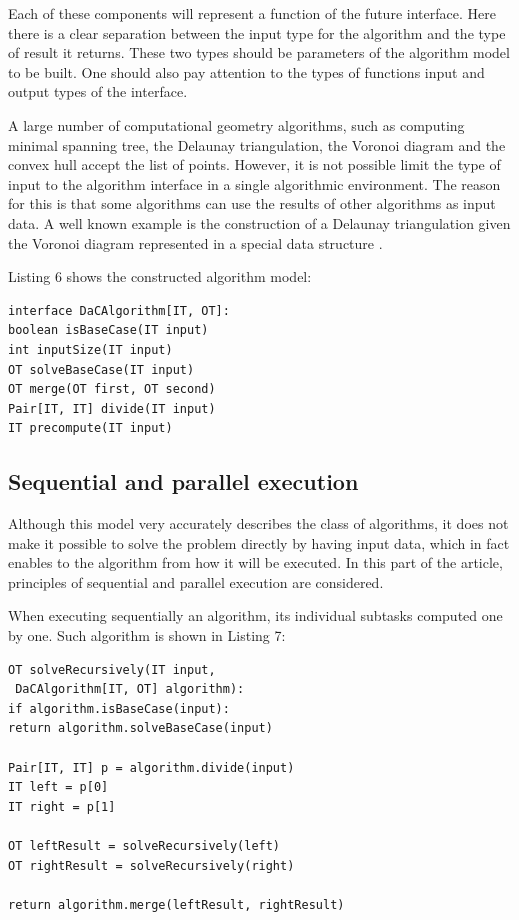 \documentclass[conference]{IEEEtran}
\theoremstyle{plane}
\begin{document}
Each of these components will represent a function of the future interface. Here there is a clear separation between the input type for the algorithm and the type of result it returns. These two types should be parameters of the algorithm model to be built. One should also pay attention to the types of functions input and output types of the interface.

A large number of computational geometry algorithms, such as computing minimal spanning tree, the Delaunay triangulation, the Voronoi diagram and the convex hull accept the list of points. However, it is not possible limit the type of input to the algorithm interface in a single algorithmic environment. The reason for this is that some algorithms can use the results of other algorithms as input data. A well known example is the construction of a Delaunay triangulation given the Voronoi diagram represented in a special data structure \cite[pp.~209]{shamos}.

Listing 6 shows the constructed algorithm model:

\begin{lstlisting}[caption={Algorithm model based on the divide and conquer principle},captionpos=b]
interface DaCAlgorithm[IT, OT]:
boolean isBaseCase(IT input)
int inputSize(IT input)
OT solveBaseCase(IT input)
OT merge(OT first, OT second)
Pair[IT, IT] divide(IT input)
IT precompute(IT input)
\end{lstlisting}

\subsection{Sequential and parallel execution}

Although this model very accurately describes the class of algorithms, it does not make it possible to solve the problem directly by having input data, which in fact enables to the algorithm from how it will be executed. In this part of the article, principles of sequential and parallel execution are considered.

When executing sequentially an algorithm, its individual subtasks computed one by one. Such algorithm is shown in Listing 7:

\begin{lstlisting}[caption={Sequential execution algorithm},captionpos=b]
OT solveRecursively(IT input,
 DaCAlgorithm[IT, OT] algorithm):
if algorithm.isBaseCase(input):
return algorithm.solveBaseCase(input)

Pair[IT, IT] p = algorithm.divide(input)
IT left = p[0]
IT right = p[1]

OT leftResult = solveRecursively(left)
OT rightResult = solveRecursively(right)

return algorithm.merge(leftResult, rightResult)
\end{lstlisting}
\end{document}
